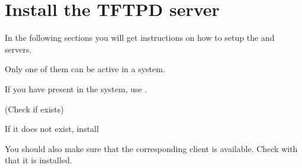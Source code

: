
\section{Install the TFTPD server}

In the following sections you will get instructions on how to
setup the  and  servers.

Only one of them can be active in a system.

If you have  present in the system, use .

(Check if  exists)

If it does not exist, install 

You should also make sure that the corresponding  client
is available. Check with  that it is installed.

